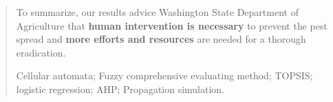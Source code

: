 \begin{abstract}
To summarize, our results advice Washington State Department of Agriculture that \textbf{human intervention is necessary} to prevent the pest spread and \textbf{more efforts and resources} are needed for a thorough eradication.

     
	\begin{keywords}
	\vspace{5pt}
	Cellular automata; Fuzzy comprehensive evaluating method; TOPSIS; logistic regression; AHP; Propagation simulation.
	\end{keywords}
\end{abstract}